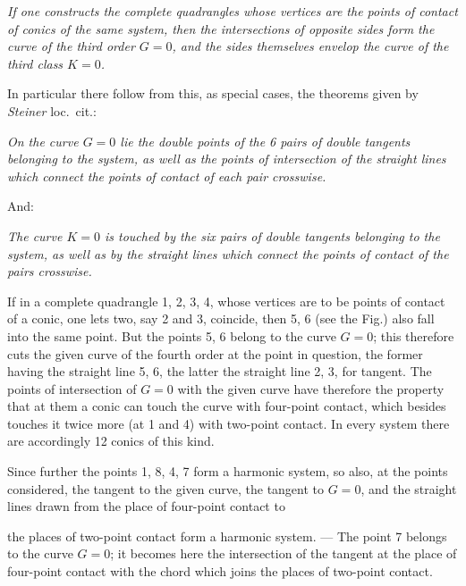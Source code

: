 \documentclass{article}
\begin{document}
\emph{If one constructs the complete quadrangles whose vertices are the points of contact of conics of the same system, then the intersections of opposite sides form the curve of the third order $G=0$, and the sides themselves envelop the curve of the third class $K=0$.}

In particular there follow from this, as special cases, the theorems given by \emph{Steiner} loc.\ cit.:

\emph{On the curve $G=0$ lie the double points of the 6 pairs of double tangents belonging to the system, as well as the points of intersection of the straight lines which connect the points of contact of each pair crosswise.}

And:

\emph{The curve $K=0$ is touched by the six pairs of double tangents belonging to the system, as well as by the straight lines which connect the points of contact of the pairs crosswise.}

If in a complete quadrangle 1, 2, 3, 4, whose vertices are to be points of contact of a conic, one lets two, say 2 and 3, coincide, then 5, 6 (see the Fig.) also fall into the same point. But the points 5, 6 belong to the curve $G=0$; this therefore cuts the given curve of the fourth order at the point in question, the former having the straight line 5, 6, the latter the straight line 2, 3, for tangent. The points of intersection of $G=0$ with the given curve have therefore the property that at them a conic can touch the curve with four-point contact, which besides touches it twice more (at 1 and 4) with two-point contact. In every system there are accordingly 12 conics of this kind.


Since further the points 1, 8, 4, 7 form a harmonic system, so also, at the points considered, the tangent to the given curve, the tangent to $G=0$, and the straight lines drawn from the place of four-point contact to

the places of two-point contact form a harmonic system. --- The point 7 belongs to the curve $G=0$; it becomes here the intersection of the tangent at the place of four-point contact with the chord which joins the places of two-point contact.
\end{document}
